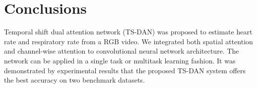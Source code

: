 \documentclass[conference]{IEEEtran}
\begin{document}
\section{Conclusions}
Temporal shift dual attention network (TS-DAN) was proposed to estimate heart rate and respiratory rate from a RGB video. We integrated both spatial attention and channel-wise attention to convolutional neural network architecture. The network can be applied in a single task or multitask learning fashion. It was demonstrated by experimental results that the proposed TS-DAN system offers the best accuracy on two benchmark datasets. 
 
{\small


}
\end{document}
